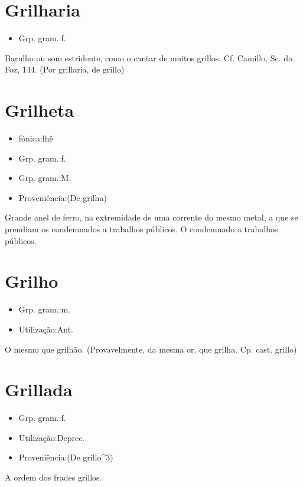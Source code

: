 \section{Grilharia}
\begin{itemize}
\item {Grp. gram.:f.}
\end{itemize}
Barulho ou som estridente, como o cantar de muitos grillos. Cf. Camillo, \textunderscore Sc. da Foz\textunderscore , 144.
(Por \textunderscore grillaria\textunderscore , de \textunderscore grillo\textunderscore )
\section{Grilheta}
\begin{itemize}
\item {fónica:lhê}
\end{itemize}
\begin{itemize}
\item {Grp. gram.:f.}
\end{itemize}
\begin{itemize}
\item {Grp. gram.:M.}
\end{itemize}
\begin{itemize}
\item {Proveniência:(De \textunderscore grilha\textunderscore )}
\end{itemize}
Grande anel de ferro, na extremidade de uma corrente do mesmo metal, a que se prendiam os condemnados a trabalhos públicos.
O condemnado a trabalhos públicos.
\section{Grilho}
\begin{itemize}
\item {Grp. gram.:m.}
\end{itemize}
\begin{itemize}
\item {Utilização:Ant.}
\end{itemize}
O mesmo que \textunderscore grilhão\textunderscore .
(Provavelmente, da mesma or. que \textunderscore grilha\textunderscore . Cp. cast. \textunderscore grillo\textunderscore )
\section{Grillada}
\begin{itemize}
\item {Grp. gram.:f.}
\end{itemize}
\begin{itemize}
\item {Utilização:Deprec.}
\end{itemize}
\begin{itemize}
\item {Proveniência:(De \textunderscore grillo\textunderscore ^3)}
\end{itemize}
A ordem dos frades grillos.
